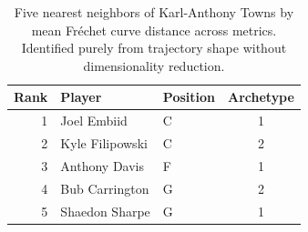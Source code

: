 \begin{table}[htbp]
  \centering\small
  \begin{tabular}{rllc}
    \toprule
    Rank & Player & Position & Archetype \\
    \midrule
    1 & Joel Embiid & C & 1 \\
    2 & Kyle Filipowski & C & 2 \\
    3 & Anthony Davis & F & 1 \\
    4 & Bub Carrington & G & 2 \\
    5 & Shaedon Sharpe & G & 1 \\
    \bottomrule
  \end{tabular}
  \caption{Five nearest neighbors of Karl-Anthony Towns by mean Fr\'{e}chet curve distance across metrics. Identified purely from trajectory shape without dimensionality reduction.}
  \label{tab:Karl_Anthony_Towns_frechet_curve_neighbors}
\end{table}


